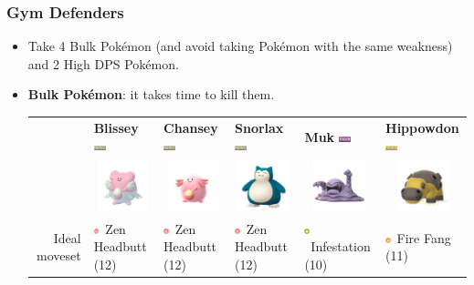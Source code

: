 \documentclass[8pt,aspectratio=169,compress]{beamer}
\newcommand{\groundfull}{\includegraphics[height=0.15cm]{../../images/type/full/Ground.png}}
\newcommand{\normalfull}{\includegraphics[height=0.15cm]{../../images/type/full/Normal.png}}
\newcommand{\poisonfull}{\includegraphics[height=0.15cm]{../../images/type/full/Poison.png}}
\newcommand{\psysimp}{\includegraphics[height=0.15cm]{../../images/type/simplified/psy.png}}
\newcommand{\firesimp}{\includegraphics[height=0.15cm]{../../images/type/simplified/fire.png}}
\newcommand{\bugsimp}{\includegraphics[height=0.15cm]{../../images/type/simplified/bug.png}}
\begin{document}
\begin{frame}
\frametitle{Gym Defenders}

\begin{block}{}
\begin{tiny}

\begin{itemize}
  \item Take 4 Bulk Pok\'emon (and avoid taking Pok\'emon with the same weakness) and 2 High DPS Pok\'emon.
  \item \textbf{Bulk Pok\'emon}: it takes time to kill them. 
  
\begin{center}
\begin{tabular}{rp{1.9cm}p{1.9cm}p{1.9cm}p{1.9cm}p{1.9cm}}
&\textbf{Blissey} \hfill \normalfull& \textbf{Chansey} \hfill \normalfull & \textbf{Snorlax} \hfill \normalfull & \textbf{Muk} \hfill \poisonfull & \textbf{Hippowdon} \hfill \groundfull \\
&\multicolumn{1}{c}{\includegraphics[width=1.5cm]{../../images/pokemon/Blissey}} & 
\multicolumn{1}{c}{\includegraphics[width=1.5cm]{../../images/pokemon/Chansey}} &
\multicolumn{1}{c}{\includegraphics[width=1.5cm]{../../images/pokemon/Snorlax}} & 
\multicolumn{1}{c}{\includegraphics[width=1.5cm]{../../images/pokemon/Muk}} &
\multicolumn{1}{c}{\includegraphics[width=1.5cm]{../../images/pokemon/Hippowdon}} \\ \hline
Ideal moveset &\psysimp~Zen Headbutt (12) & \psysimp~Zen Headbutt (12) & \psysimp~Zen Headbutt (12) & \bugsimp~Infestation (10) & \firesimp~Fire Fang (11)  \\

\end{tabular}
\end{center}
\end{itemize}
\end{tiny}
\end{block}
\end{frame}
\end{document}
